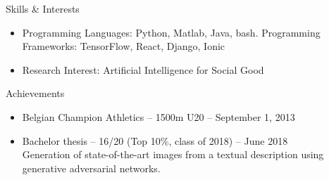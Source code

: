 \documentclass[]{mcdowellcv}
\begin{document}
\makeheader
      
\begin{cvsection}{Skills \& Interests}
	\begin{cvsubsection}{}{}{}
		\begin{itemize}
			\item Programming Languages:  Python, Matlab, Java, bash. Programming Frameworks:  TensorFlow, React, Django, Ionic
			\item Research Interest: Artificial Intelligence for Social Good
		\end{itemize}
	\end{cvsubsection}
\end{cvsection}
\begin{cvsection}{Achievements}
\begin{cvsubsection}{}{}{}
\begin{itemize}
	\item Belgian Champion Athletics -- 1500m U20 -- September 1, 2013
	\item Bachelor thesis -- 16/20 (Top 10\%, class of 2018) -- June 2018
	\\Generation of state-of-the-art images from a textual description using generative adversarial networks.
\end{itemize}
\end{cvsubsection}
\end{cvsection}
\end{document}
